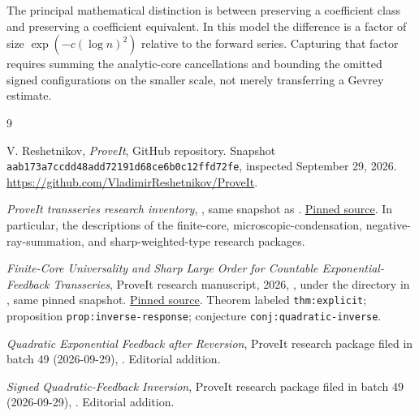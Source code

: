 \documentclass[11pt,a4paper]{article}
\numberwithin{equation}{section}
\theoremstyle{definition}\newtheorem{definition}[theorem]{Definition}
\theoremstyle{remark}\newtheorem{remark}[theorem]{Remark}
\theoremstyle{definition}
\newcommand{\RepoCommit}{aab173a7ccdd48add72191d68ce6b0c12ffd72fe}
\begin{document}
The principal mathematical distinction is between preserving a coefficient
class and preserving a coefficient equivalent. In this model the difference
is a factor of size \(\exp(-c(\log n)^2)\) relative to the forward
series. Capturing that factor requires summing the analytic-core
cancellations and bounding the omitted signed configurations on the
smaller scale, not merely transferring a Gevrey estimate.

\begin{thebibliography}{9}
\raggedright
{}

V. Reshetnikov, \emph{ProveIt}, GitHub repository.
Snapshot \texttt{\RepoCommit}, inspected September 29, 2026.
\url{https://github.com/VladimirReshetnikov/ProveIt}.

\emph{ProveIt transseries research inventory},
,
same snapshot as \cite{repo}.
\href{https://github.com/VladimirReshetnikov/ProveIt/blob/aab173a7ccdd48add72191d68ce6b0c12ffd72fe/Analysis/Transseries/docs/series-and-transseries/README.md}{Pinned source}.
In particular, the descriptions of the finite-core, microscopic-condensation,
negative-ray-summation, and sharp-weighted-type research packages.

\emph{Finite-Core Universality and Sharp Large Order for Countable
Exponential-Feedback Transseries}, ProveIt research manuscript, 2026,
,
under the directory in \cite{inventory}, same pinned snapshot.
\href{https://github.com/VladimirReshetnikov/ProveIt/blob/aab173a7ccdd48add72191d68ce6b0c12ffd72fe/Analysis/Transseries/docs/series-and-transseries/Finite_Core_Universality_Exponential_Feedback/article.tex}{Pinned source}.
Theorem labeled \texttt{thm:explicit}; proposition
\texttt{prop:inverse-response}; conjecture \texttt{conj:quadratic-inverse}.

\emph{Quadratic Exponential Feedback after Reversion}, ProveIt research
package filed in batch 49 (2026-09-29),
.
Editorial addition.

\emph{Signed Quadratic-Feedback Inversion}, ProveIt research package filed
in batch 49 (2026-09-29),
.
Editorial addition.


\end{thebibliography}
\end{document}
